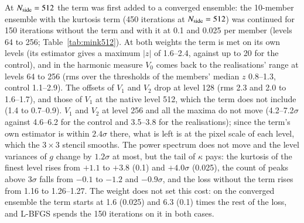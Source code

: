 \documentclass{aa}
\newcommand{\nside}{N_{\rm side}}
\begin{document}
At $\nside=512$ the term was first added to a converged ensemble: the 10-member ensemble with the kurtosis term (450 iterations at $\nside=512$) was continued for 150 iterations without the term and with it at 0.1 and 0.025 per member (levels 64 to 256; Table~\ref{tab:mink512}). At both weights the term is met on its own levels (its estimator gives a maximum $|z|$ of 1.6--2.4, against up to 20 for the control), and in the harmonic measure $V_0$ comes back to the realisations' range at levels 64 to 256 (rms over the thresholds of the members' median $z$ 0.8--1.3, control 1.1--2.9). The offsets of $V_1$ and $V_2$ drop at level 128 (rms 2.3 and 2.0 to 1.6--1.7), and those of $V_1$ at the native level 512, which the term does not include (1.4 to 0.7--0.9). $V_1$ and $V_2$ at level 256 and all the maxima do not move (4.2--7.2$\sigma$ against 4.6--6.2 for the control and 3.5--3.8 for the realisations); since the term's own estimator is within $2.4\sigma$ there, what is left is at the pixel scale of each level, which the $3\times3$ stencil smooths. The power spectrum does not move and the level variances of $g$ change by $1.2\sigma$ at most, but the tail of $\kappa$ pays: the kurtosis of the finest level rises from $+1.1$ to $+3.8$ (0.1) and $+4.0\sigma$ (0.025), the count of peaks above $3\sigma$ falls from $-0.1$ to $-1.2$ and $-0.9\sigma$, and the loss without the term rises from 1.16 to 1.26--1.27. The weight does not set this cost: on the converged ensemble the term starts at 1.6 (0.025) and 6.3 (0.1) times the rest of the loss, and L-BFGS spends the 150 iterations on it in both cases.
\end{document}
